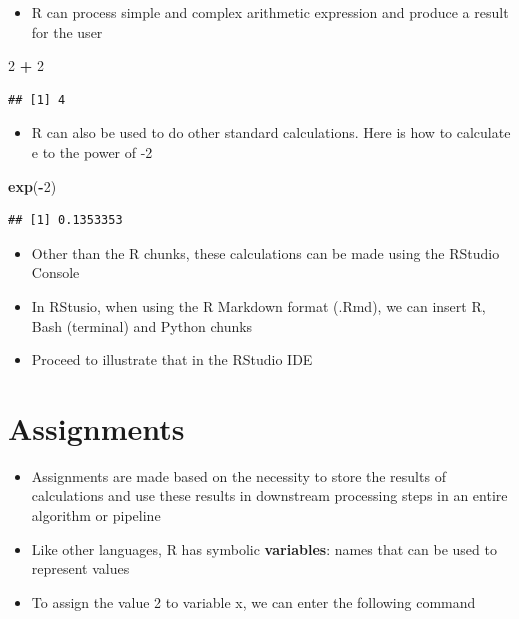 \documentclass[
]{book}
\newenvironment{Shaded}{\begin{snugshade}}{\end{snugshade}}
\newcommand{\DecValTok}[1]{\textcolor[rgb]{0.00,0.00,0.81}{#1}}
\newcommand{\FunctionTok}[1]{\textcolor[rgb]{0.13,0.29,0.53}{\textbf{#1}}}
\newcommand{\NormalTok}[1]{#1}
\newcommand{\SpecialCharTok}[1]{\textcolor[rgb]{0.81,0.36,0.00}{\textbf{#1}}}
\providecommand{\tightlist}{%
  \setlength{\itemsep}{0pt}\setlength{\parskip}{0pt}}
\begin{document}
\begin{itemize}
\tightlist
\item
  R can process simple and complex arithmetic expression and produce a result for the user
\end{itemize}

\begin{Shaded}
\begin{Highlighting}[]
\DecValTok{2} \SpecialCharTok{+} \DecValTok{2}
\end{Highlighting}
\end{Shaded}

\begin{verbatim}
## [1] 4
\end{verbatim}

\begin{itemize}
\tightlist
\item
  R can also be used to do other standard calculations. Here is how to calculate e to the power of -2
\end{itemize}

\begin{Shaded}
\begin{Highlighting}[]
\FunctionTok{exp}\NormalTok{(}\SpecialCharTok{{-}}\DecValTok{2}\NormalTok{)}
\end{Highlighting}
\end{Shaded}

\begin{verbatim}
## [1] 0.1353353
\end{verbatim}

\begin{itemize}
\item
  Other than the R chunks, these calculations can be made using the RStudio Console
\item
  In RStusio, when using the R Markdown format (.Rmd), we can insert R, Bash (terminal) and Python chunks
\item
  Proceed to illustrate that in the RStudio IDE
\end{itemize}

\section{Assignments}\label{assignments}

\begin{itemize}
\item
  Assignments are made based on the necessity to store the results of calculations and use these results in downstream processing steps in an entire algorithm or pipeline
\item
  Like other languages, R has symbolic \textbf{variables}: names that can be used to represent values
\item
  To assign the value 2 to variable x, we can enter the following command
\end{itemize}
\end{document}
